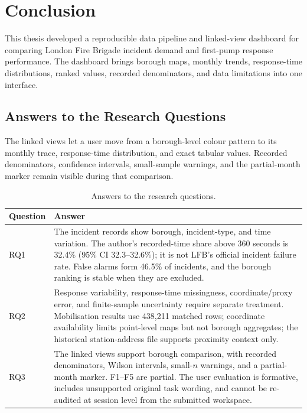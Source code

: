 \section{Conclusion}

This thesis developed a reproducible data pipeline and linked-view dashboard for comparing London Fire Brigade incident demand and first-pump response performance. The dashboard brings borough maps, monthly trends, response-time distributions, ranked values, recorded denominators, and data limitations into one interface.

\subsection{Answers to the Research Questions}

The linked views let a user move from a borough-level colour pattern to its monthly trace, response-time distribution, and exact tabular values. Recorded denominators, confidence intervals, small-sample warnings, and the partial-month marker remain visible during that comparison.

\begin{table}[h]
\centering
\small
\begin{tabularx}{\textwidth}{p{1.5cm}X}
\toprule
Question & Answer \\
\midrule
RQ1 & The incident records show borough, incident-type, and time variation. The author's recorded-time share above 360 seconds is 32.4\% (95\% CI 32.3--32.6\%); it is not LFB's official incident failure rate. False alarms form 46.5\% of incidents, and the borough ranking is stable when they are excluded. \\
RQ2 & Response variability, response-time missingness, coordinate/proxy error, and finite-sample uncertainty require separate treatment. Mobilisation results use 438{,}211 matched rows; coordinate availability limits point-level maps but not borough aggregates; the historical station-address file supports proximity context only. \\
RQ3 & The linked views support borough comparison, with recorded denominators, Wilson intervals, small-$n$ warnings, and a partial-month marker. F1--F5 are partial. The user evaluation is formative, includes unsupported original task wording, and cannot be re-audited at session level from the submitted workspace. \\
\bottomrule
\end{tabularx}
\caption{Answers to the research questions.}
\label{tab:conclusion-rq-answers}
\end{table}

